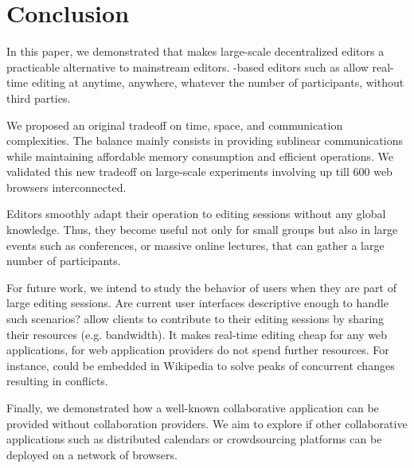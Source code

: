 
\section{Conclusion}
\label{sec:conclusion}

In this paper, we demonstrated that \LSEQ makes large-scale decentralized
editors a practicable alternative to mainstream editors. \LSEQ-based editors
such as \CRATE allow real-time editing at anytime, anywhere, whatever the number
of participants, without third parties.

We proposed an original tradeoff on time, space, and communication
complexities. The balance mainly consists in providing sublinear communications
while maintaining affordable memory consumption and efficient operations.  We
validated this new tradeoff on large-scale experiments involving up till 600 web
browsers interconnected.

Editors smoothly adapt their operation to editing sessions without any global
knowledge. Thus, they become useful not only for small groups but also in large
events such as conferences, or massive online lectures, that can gather a large
number of participants.

For future work, we intend to study the behavior of users when they are part of
large editing sessions. Are current user interfaces descriptive enough to handle
such scenarios?  \CRATE allow clients to contribute to their editing sessions by
sharing their resources (e.g. bandwidth).  It makes real-time editing cheap for
any web applications, for web application providers do not spend further
resources. For instance, \CRATE could be embedded in Wikipedia to solve peaks of
concurrent changes resulting in
conflicts. %

Finally, we demonstrated how a well-known collaborative application can be
provided without collaboration providers. We aim to explore if other
collaborative applications such as distributed calendars or crowdsourcing
platforms can be deployed on a network of browsers.




